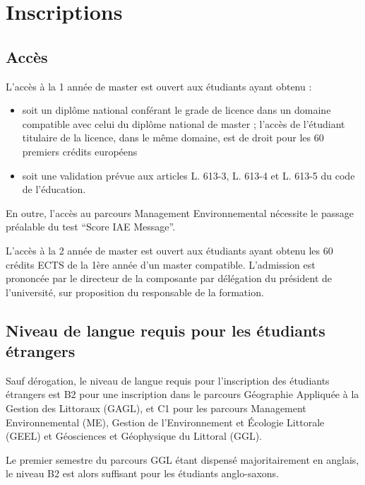 \documentclass[a4paper,11pt]{article}
\begin{document}

\section{Inscriptions}\label{Inscriptions}
\subsection{Accès}\label{Acces}
\setcounter{page}{1}

L'accès à la 1\iere{} année de master est ouvert aux étudiants ayant obtenu :
\begin{itemize} 
\item soit un diplôme national conférant le grade de licence dans un domaine compatible avec celui du diplôme national de master ; l'accès de l'étudiant titulaire de la licence, dans le même domaine, est de droit pour les 60 premiers crédits européens
\item soit une validation prévue aux articles L. 613-3, L. 613-4 et L. 613-5 du code de l'éducation.
\end{itemize}

En outre, l'accès au parcours Management Environnemental nécessite le passage préalable du test ``Score IAE Message''.

L'accès à la 2\ieme{} année de master est ouvert aux étudiants ayant obtenu les 60 crédits ECTS de la 1ère année d'un master compatible. L'admission est prononcée par le directeur de la composante par délégation du président de l'université, sur proposition du responsable de la formation.


\subsection{Niveau de langue requis pour les étudiants étrangers}\label{langue}
Sauf dérogation, le niveau de langue requis pour l'inscription des étudiants étrangers est B2 pour une inscription dans le parcours Géographie Appliquée à la Gestion des Littoraux (GAGL), et C1 pour les parcours Management Environnemental (ME), Gestion de l'Environnement et Écologie Littorale (GEEL) et Géosciences et Géophysique du Littoral (GGL).

Le premier semestre du parcours GGL étant dispensé majoritairement en anglais, le niveau B2 est alors suffisant pour les étudiants anglo-saxons.
\end{document}
